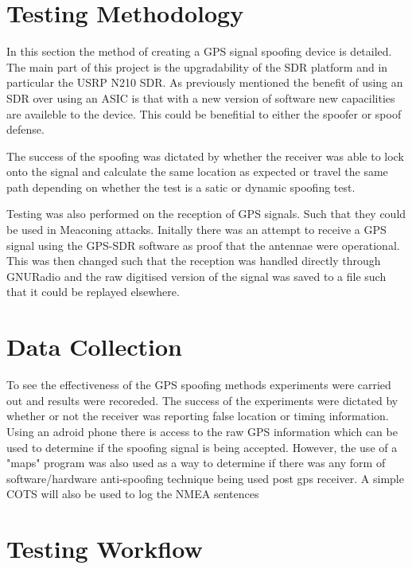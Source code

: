 
\section{Testing Methodology}

In this section the method of creating a GPS signal spoofing device is detailed. The main part of this project is the upgradability of the SDR platform
and in particular the USRP N210 SDR. As previously mentioned the benefit of using an SDR over using an ASIC is that with a new version of software 
new capacilities are availeble to the device. This could be benefitial to either the spoofer or spoof defense. 

The success of the spoofing was dictated by whether the receiver was able to lock onto the signal and calculate the same location as expected or travel the same path
depending on whether the test is a satic or dynamic spoofing test. 

Testing was also performed on the reception of GPS signals. Such that they could be used in Meaconing attacks. Initally there was an attempt to receive a GPS signal using
the GPS-SDR software as proof that the antennae were operational. This was then changed such that the reception was handled directly through GNURadio and the raw
digitised version of the signal was saved to a file such that it could be replayed elsewhere.

\section{Data Collection}

To see the effectiveness of the GPS spoofing methods experiments were carried out and results were recoreded. The success of the experiments were dictated by whether or
not the receiver was reporting false location or timing information. Using an adroid phone there is access to the raw GPS information which can be used to determine if
the spoofing signal is being accepted. However, the use of a "maps" program was also used as a way to determine if there was any form of software/hardware anti-spoofing
technique being used post gps receiver. A simple COTS will also be used to log the NMEA sentences 

\section{Testing Workflow}

